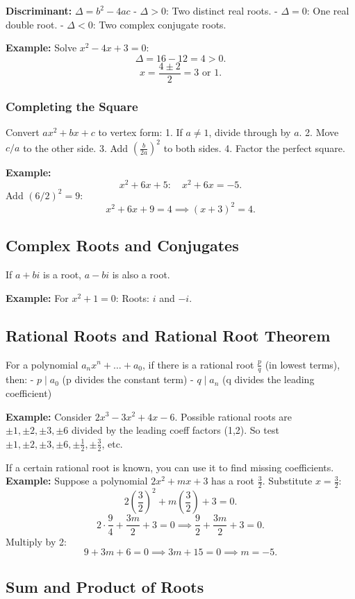 \documentclass{article}
\begin{document}
\begin{multicols}{2}
\textbf{Discriminant:} \(\Delta=b^2-4ac\)
- \(\Delta>0\): Two distinct real roots.
- \(\Delta=0\): One real double root.
- \(\Delta<0\): Two complex conjugate roots.

\textbf{Example:}
Solve \(x^2 -4x+3=0\):
\[
\Delta=16-12=4>0.
\]
\[
x=\frac{4\pm2}{2}=3 \text{ or }1.
\]

\subsubsection*{Completing the Square}
Convert \(ax^2+bx+c\) to vertex form:
1. If \(a \neq 1\), divide through by \(a\).
2. Move \(c/a\) to the other side.
3. Add \(\left(\frac{b}{2a}\right)^2\) to both sides.
4. Factor the perfect square.

\textbf{Example:}
\[
x^2+6x+5: \quad x^2+6x=-5.
\]
Add \((6/2)^2=9\):
\[
x^2+6x+9=4 \implies (x+3)^2=4.
\]

\subsection*{Complex Roots and Conjugates}
If \(a+bi\) is a root, \(a-bi\) is also a root.

\textbf{Example:}
For \(x^2+1=0\):
Roots: \(i\) and \(-i\).

\subsection*{Rational Roots and Rational Root Theorem}
For a polynomial \(a_nx^n+\dots+a_0\), if there is a rational root \(\frac{p}{q}\) (in lowest terms), then:
- \(p \mid a_0\) (p divides the constant term)
- \(q \mid a_n\) (q divides the leading coefficient)

\textbf{Example:}
Consider \(2x^3-3x^2+4x-6\). Possible rational roots are \(\pm 1, \pm 2, \pm 3, \pm 6\) divided by the leading coeff factors (1,2). So test \(\pm1,\pm2,\pm3,\pm6,\pm\frac{1}{2},\pm\frac{3}{2}\), etc.

If a certain rational root is known, you can use it to find missing coefficients.  
\textbf{Example:}
Suppose a polynomial \(2x^2+mx+3\) has a root \(\frac{3}{2}\). Substitute \(x=\frac{3}{2}\):
\[
2\left(\frac{3}{2}\right)^2 + m\left(\frac{3}{2}\right) + 3=0.
\]
\[
2\cdot\frac{9}{4}+\frac{3m}{2}+3=0 \implies \frac{9}{2}+\frac{3m}{2}+3=0.
\]
Multiply by 2:
\[
9+3m+6=0 \implies 3m+15=0 \implies m=-5.
\]

\subsection*{Sum and Product of Roots}


\end{multicols}
\end{document}
